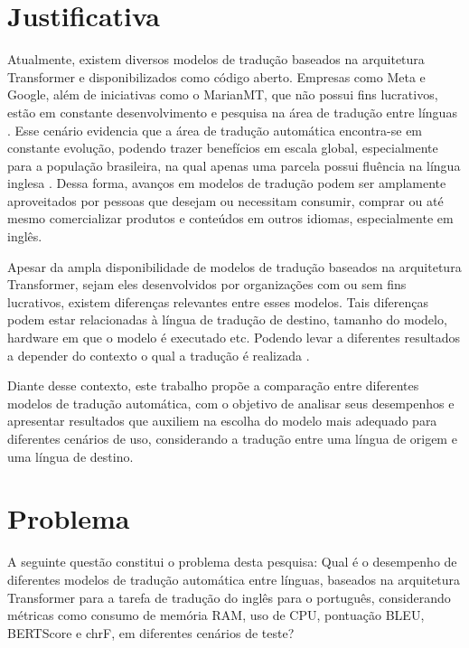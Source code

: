 \section{Justificativa} %

Atualmente, existem diversos modelos de tradução baseados na arquitetura Transformer e disponibilizados como código aberto. Empresas como Meta e Google, além de iniciativas como o MarianMT, que não possui fins lucrativos, estão em constante desenvolvimento e pesquisa na área de tradução entre línguas \cite{feiner2025universal}. Esse cenário evidencia que a área de tradução automática encontra-se em constante evolução, podendo trazer benefícios em escala global, especialmente para a população brasileira, na qual apenas uma parcela possui fluência na língua inglesa \cite{oliveira2026apenas}. Dessa forma, avanços em modelos de tradução podem ser amplamente aproveitados por pessoas que desejam ou necessitam consumir, comprar ou até mesmo comercializar produtos e conteúdos em outros idiomas, especialmente em inglês.

Apesar da ampla disponibilidade de modelos de tradução baseados na arquitetura Transformer, sejam eles desenvolvidos por organizações com ou sem fins lucrativos, existem diferenças relevantes entre esses modelos. Tais diferenças podem estar relacionadas à língua de tradução de destino, tamanho do modelo, hardware em que o modelo é executado etc. Podendo levar a diferentes resultados a depender do contexto o qual a tradução é realizada \cite{licht2026validating}.

Diante desse contexto, este trabalho propõe a comparação entre diferentes modelos de tradução automática, com o objetivo de analisar seus desempenhos e apresentar resultados que auxiliem na escolha do modelo mais adequado para diferentes cenários de uso, considerando a tradução entre uma língua de origem e uma língua de destino.

\section{Problema}

A seguinte questão constitui o problema desta pesquisa: 
Qual é o desempenho de diferentes modelos de tradução automática entre línguas, baseados na arquitetura Transformer para a tarefa de tradução do inglês para o português, considerando métricas como consumo de memória RAM, uso de CPU, pontuação BLEU, BERTScore e chrF, em diferentes cenários de teste?


